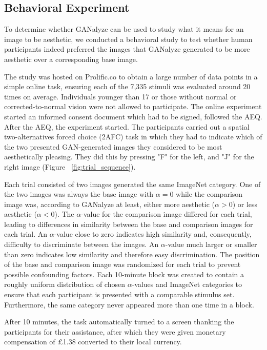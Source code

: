 \documentclass[../main.tex]{subfiles}
\begin{document}
	
	
	\subsection{Behavioral Experiment}
	To determine whether GANalyze can be used to study what it means for an image to be aesthetic, we conducted a behavioral study to test whether human participants indeed preferred the images that GANalyze generated to be more aesthetic over a corresponding base image.
	
	The study was hosted on Prolific.co to obtain a large number of data points in a simple online task, ensuring each of the 7,335 stimuli was evaluated around 20 times on average. Individuals younger than 17 or those without normal or corrected-to-normal vision were not allowed to participate. The online experiment started an informed consent document which had to be signed, followed the AEQ. After the AEQ, the experiment started.	The participants carried out a spatial two-alternatives forced choice (2AFC) task in which they had to indicate which of the two presented GAN-generated images they considered to be most aesthetically pleasing. They did this by pressing "F" for the left, and "J" for the right image (Figure ~\ref{fig:trial_sequence}).
	
	Each trial consisted of two images generated the same ImageNet category. One of the two images was always the base image with $\alpha = 0$ while the comparison image was, according to GANalyze at least, either more aesthetic ($\alpha > 0$) or less aesthetic ($\alpha < 0$). The $\alpha$-value for the comparison image differed for each trial, leading to differences in similarity between the base and comparison images for each trial. An $\alpha$-value close to zero indicates high similarity and, consequently, difficulty to discriminate between the images. An $\alpha$-value much larger or smaller than zero indicates low similarity and therefore easy discrimination. The position of the base and comparison image was randomized for each trial to prevent possible confounding factors. Each 10-minute block was created to contain a roughly uniform distribution of chosen $\alpha$-values and ImageNet categories to ensure that each participant is presented with a comparable stimulus set. Furthermore, the same category never appeared more than one time in a block.
	
	After 10 minutes, the task automatically turned to a screen thanking the participants for their assistance, after which they were given monetary compensation of £1.38 converted to their local currency.
	
\end{document}
